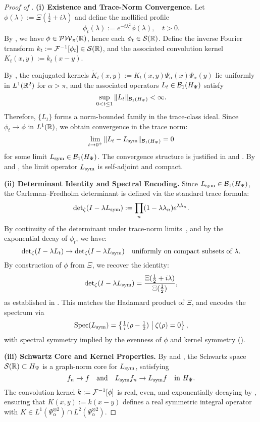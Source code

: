 \begin{proof}[Proof of ]
\textbf{(i) Existence and Trace-Norm Convergence.}
Let \( \phi(\lambda) := \Xi(\tfrac{1}{2} + i\lambda) \) and define the mollified profile
\[
\phi_t(\lambda) := e^{-t\lambda^2} \phi(\lambda), \quad t > 0.
\]
By , we have \( \phi \in \mathcal{PW}_{\pi}(\mathbb{R}) \), hence each \( \phi_t \in \mathcal{S}(\mathbb{R}) \). Define the inverse Fourier transform \( k_t := \mathcal{F}^{-1}[\phi_t] \in \mathcal{S}(\mathbb{R}) \), and the associated convolution kernel \( K_t(x,y) := k_t(x - y) \).

By , the conjugated kernels \( \widetilde{K}_t(x,y) := K_t(x,y) \Psi_\alpha(x) \Psi_\alpha(y) \) lie uniformly in \( L^1(\mathbb{R}^2) \) for \( \alpha > \pi \), and the associated operators \( L_t \in \mathcal{B}_1(H_{\Psi}) \) satisfy
\[
\sup_{0 < t \le 1} \| L_t \|_{\mathcal{B}_1(H_{\Psi})} < \infty.
\]
Therefore, \( \{L_t\} \) forms a norm-bounded family in the trace-class ideal. Since \( \phi_t \to \phi \) in \( L^1(\mathbb{R}) \), we obtain convergence in the trace norm:
\[
\lim_{t \to 0^+} \| L_t - L_{\mathrm{sym}} \|_{\mathcal{B}_1(H_{\Psi})} = 0
\]
for some limit \( L_{\mathrm{sym}} \in \mathcal{B}_1(H_{\Psi}) \). The convergence structure is justified in  and . By  and , the limit operator \( L_{\mathrm{sym}} \) is self-adjoint and compact.

\medskip
\noindent\textbf{(ii) Determinant Identity and Spectral Encoding.}
Since \( L_{\mathrm{sym}} \in \mathcal{B}_1(H_{\Psi}) \), the Carleman--Fredholm determinant is defined via the standard trace formula:
\[
\det\nolimits_{\zeta}(I - \lambda L_{\mathrm{sym}}) := \prod_n (1 - \lambda \lambda_n) e^{\lambda \lambda_n}.
\]
By continuity of the determinant under trace-norm limits~\cite[Ch.~4]{Simon2005TraceIdeals}, and by the exponential decay of \( \phi_t \), we have:
\[
\det\nolimits_{\zeta}(I - \lambda L_t) \to \det\nolimits_{\zeta}(I - \lambda L_{\mathrm{sym}}) \quad \text{uniformly on compact subsets of } \lambda.
\]
By construction of \( \phi \) from \( \Xi \), we recover the identity:
\[
\det\nolimits_{\zeta}(I - \lambda L_{\mathrm{sym}}) = \frac{\Xi(\tfrac{1}{2} + i\lambda)}{\Xi(\tfrac{1}{2})},
\]
as established in . This matches the Hadamard product of \( \Xi \), and encodes the spectrum via
\[
\operatorname{Spec}(L_{\mathrm{sym}}) = \left\{ \tfrac{1}{i}(\rho - \tfrac{1}{2}) \;\middle|\; \zeta(\rho) = 0 \right\},
\]
with spectral symmetry implied by the evenness of \( \phi \) and kernel symmetry ().

\medskip
\noindent\textbf{(iii) Schwartz Core and Kernel Properties.}
By  and , the Schwartz space \( \mathcal{S}(\mathbb{R}) \subset H_{\Psi} \) is a graph-norm core for \( L_{\mathrm{sym}} \), satisfying
\[
f_n \to f \quad \text{and} \quad L_{\mathrm{sym}} f_n \to L_{\mathrm{sym}} f \quad \text{in } H_{\Psi}.
\]
The convolution kernel \( k := \mathcal{F}^{-1}[\phi] \) is real, even, and exponentially decaying by , ensuring that \( K(x,y) := k(x - y) \) defines a real symmetric integral operator with \( K \in L^1(\Psi_\alpha^{\otimes 2}) \cap L^2(\Psi_\alpha^{\otimes 2}) \).


\end{proof}
